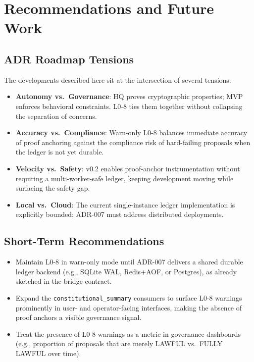 \documentclass[11pt]{article}
\begin{document}
\section{Recommendations and Future Work}

\subsection{ADR Roadmap Tensions}

The developments described here sit at the intersection of several tensions:
\begin{itemize}[nosep]
  \item \textbf{Autonomy vs.\ Governance}: HQ proves cryptographic properties; MVP enforces behavioral constraints. L0-8 ties them together without collapsing the separation of concerns.
  \item \textbf{Accuracy vs.\ Compliance}: Warn-only L0-8 balances immediate accuracy of proof anchoring against the compliance risk of hard-failing proposals when the ledger is not yet durable.
  \item \textbf{Velocity vs.\ Safety}: v0.2 enables proof-anchor instrumentation without requiring a multi-worker-safe ledger, keeping development moving while surfacing the safety gap.
  \item \textbf{Local vs.\ Cloud}: The current single-instance ledger implementation is explicitly bounded; ADR-007 must address distributed deployments.
\end{itemize}

\subsection{Short-Term Recommendations}

\begin{itemize}[nosep]
  \item Maintain L0-8 in warn-only mode until ADR-007 delivers a shared durable ledger backend (e.g., SQLite WAL, Redis+AOF, or Postgres), as already sketched in the bridge contract.\cite{cite:44,cite:46,cite:47}
  \item Expand the \texttt{constitutional\_summary} consumers to surface L0-8 warnings prominently in user- and operator-facing interfaces, making the absence of proof anchors a visible governance signal.
  \item Treat the presence of L0-8 warnings as a metric in governance dashboards (e.g., proportion of proposals that are merely LAWFUL vs.\ FULLY LAWFUL over time).
\end{itemize}
\end{document}
